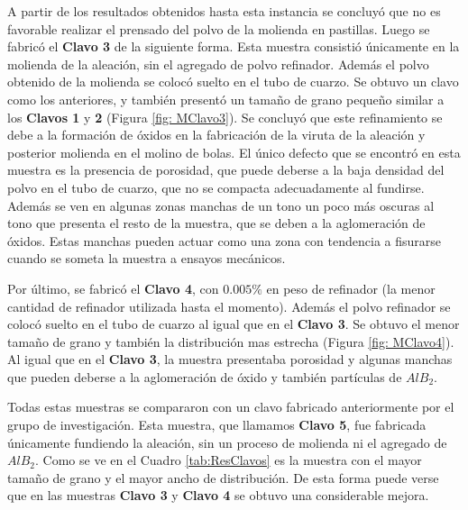 \documentclass[a4paper,12pt,fleqn,twoside,openany]{book}
\begin{document}
A partir de los resultados obtenidos hasta esta instancia se concluyó que no es favorable realizar el prensado del polvo de la molienda en pastillas. 
Luego se fabricó el \textbf{Clavo 3} de la siguiente forma. Esta muestra consistió únicamente en la molienda de la aleación, sin el agregado de polvo refinador. Además el polvo obtenido de la molienda se colocó suelto en el tubo de cuarzo. Se obtuvo un clavo como los anteriores, y también presentó un tamaño de grano pequeño similar a los \textbf{Clavos 1} y \textbf{2} (Figura \ref{fig: MClavo3}). Se concluyó que este refinamiento se debe a la formación de óxidos en la fabricación de la viruta de la aleación y posterior molienda en el molino de bolas. El único defecto que se encontró en esta muestra es la presencia de porosidad, que puede deberse a la baja densidad del polvo en el tubo de cuarzo, que no se compacta adecuadamente al fundirse. Además se ven en algunas zonas manchas de un tono un poco más oscuras al tono que presenta el resto de la muestra, que se deben a la aglomeración de óxidos. Estas manchas pueden actuar como una zona con tendencia a fisurarse cuando se someta la muestra a ensayos mecánicos. 

Por último, se fabricó el  \textbf{Clavo 4}, con $0.005 \%$ en peso de refinador (la menor cantidad de refinador utilizada hasta el momento). Además el polvo refinador se colocó suelto en el tubo de cuarzo al igual que en el \textbf{Clavo 3}. Se obtuvo el menor tamaño de grano y también la distribución mas estrecha (Figura \ref{fig: MClavo4}). Al igual que en el \textbf{Clavo 3}, la muestra presentaba porosidad y algunas manchas que pueden deberse a la aglomeración de óxido y también partículas de $AlB_2$.
 


Todas estas muestras se compararon con un clavo fabricado anteriormente por el grupo de investigación. Esta muestra, que llamamos \textbf{Clavo 5}, fue fabricada únicamente fundiendo la aleación, sin un proceso de molienda ni el agregado de $AlB_2$. Como se ve en el Cuadro \ref{tab:ResClavos} es la muestra con el mayor tamaño de grano y el mayor ancho de distribución. De esta forma puede verse que en las muestras \textbf{Clavo 3} y \textbf{Clavo 4} se obtuvo una considerable mejora.   
\end{document}
